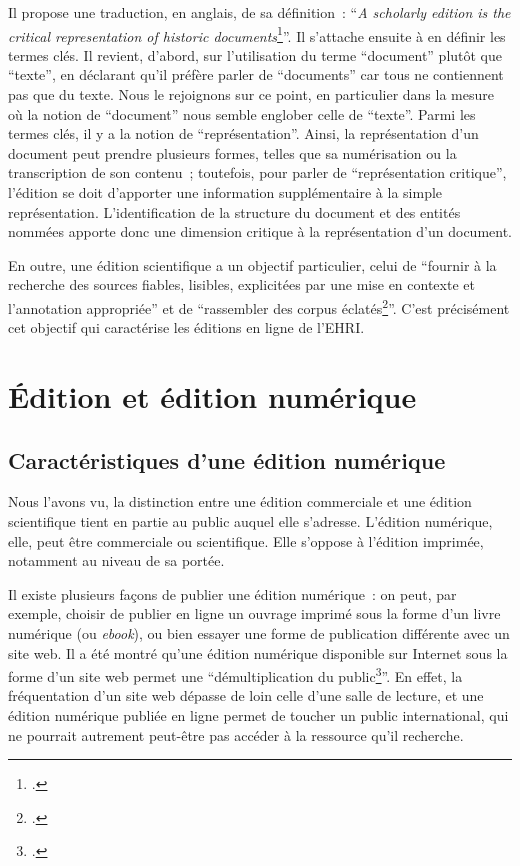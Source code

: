 Il propose une traduction, en anglais, de sa définition~: \enquote{\textit{A scholarly edition is the critical representation of historic documents}\footcite[p.~23]{Sahle2016}}. Il s'attache ensuite à en définir les termes clés. Il revient, d'abord, sur l'utilisation du terme \enquote{document} plutôt que \enquote{texte}, en déclarant qu'il préfère parler de \enquote{documents} car tous ne contiennent pas que du texte. Nous le rejoignons sur ce point, en particulier dans la mesure où la notion de \enquote{document} nous semble englober celle de \enquote{texte}. Parmi les termes clés, il y a la notion de \enquote{représentation}. Ainsi, la représentation d'un document peut prendre plusieurs formes, telles que sa numérisation ou la transcription de son contenu~; toutefois, pour parler de \enquote{représentation critique}, l'édition se doit d'apporter une information supplémentaire à la simple représentation. L'identification de la structure du document et des entités nommées apporte donc une dimension critique à la représentation d'un document.  

En outre, une édition scientifique a un objectif particulier, celui de \enquote{fournir à la recherche des sources fiables, lisibles, explicitées par une mise en contexte et l'annotation appropriée} et de \enquote{rassembler des corpus éclatés\footcite[p.~19]{NougaretParinet2015}}. C'est précisément cet objectif qui caractérise les éditions en ligne de l'EHRI.



\section{Édition et édition numérique}

\subsection{Caractéristiques d'une édition numérique}
Nous l'avons vu, la distinction entre une édition commerciale et une édition scientifique tient en partie au public auquel elle s'adresse. L'édition numérique, elle, peut être commerciale ou scientifique. Elle s'oppose à l'édition imprimée, notamment au niveau de sa portée.  

Il existe plusieurs façons de publier une édition numérique~: on peut, par exemple, choisir de publier en ligne un ouvrage imprimé sous la forme d'un livre numérique (ou \textit{ebook}), ou bien essayer une forme de publication différente avec un site web. Il a été montré qu'une édition numérique disponible sur Internet sous la forme d'un site web permet une \enquote{démultiplication du public\footcite[p.~314]{Archivistique2020}}. En effet, la fréquentation d'un site web dépasse de loin celle d'une salle de lecture, et une édition numérique publiée en ligne permet de toucher un public international, qui ne pourrait autrement peut-être pas accéder à la ressource qu'il recherche.  

